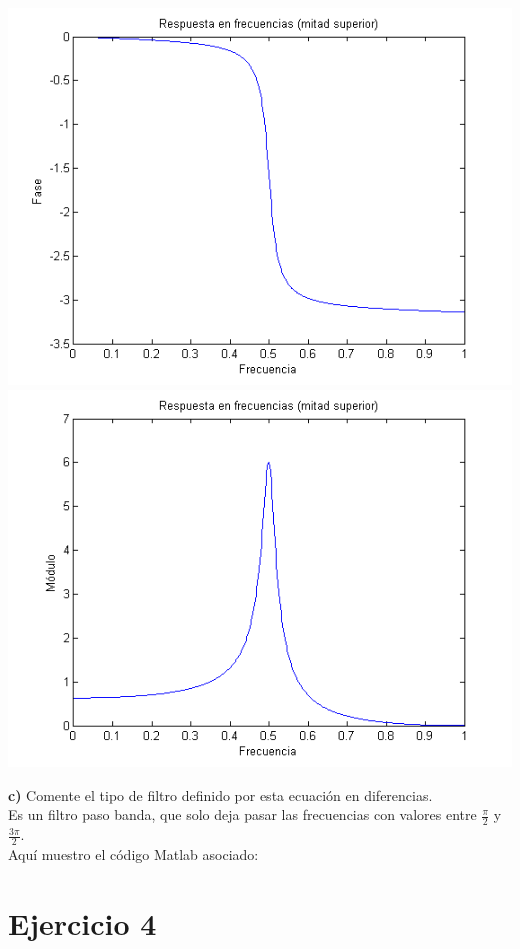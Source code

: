 \documentclass[a4paper,12pt]{article}
\begin{document}
\begin{center}
\includegraphics[width=.8 \textwidth]{respuesta-frecuencias-unidad-fase-mitad-ejercicio-3.png}
\includegraphics[width=.8 \textwidth]{respuesta-frecuencias-unidad-modulo-mitad-ejercicio-3.png}
\end{center}

\textbf{c)} Comente el tipo de filtro definido por esta ecuación en diferencias. \\

Es un filtro paso banda, que solo deja pasar las frecuencias con valores entre $\frac{\pi}{2}$ y $\frac{3 \pi}{2}$.\\

Aquí muestro el código Matlab asociado:\\


\section{Ejercicio 4}
\end{document}
